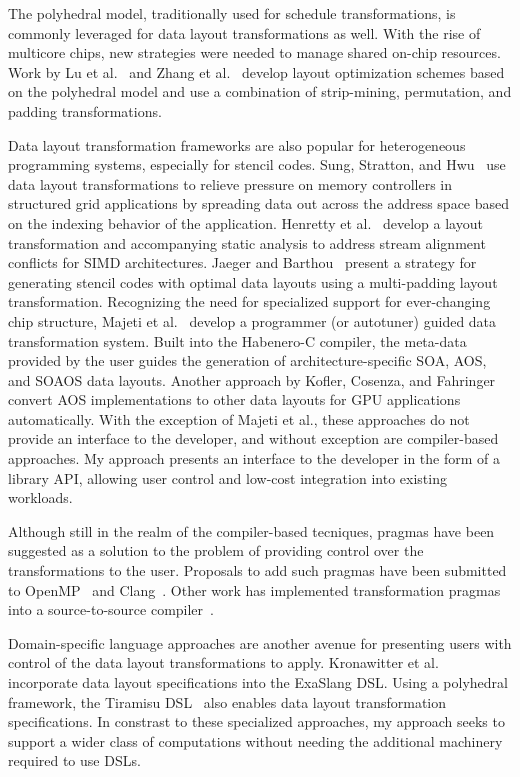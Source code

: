 \documentclass{article}
\begin{document}
The polyhedral model, traditionally used for schedule transformations, is commonly leveraged for data layout transformations as well.
With the rise of multicore chips, new strategies were needed to manage shared on-chip resources. 
Work by Lu et al.~\cite{lu2009data} and Zhang et al.~\cite{zhang2011optimizing} develop layout optimization schemes based on the polyhedral model and use a combination of strip-mining, permutation, and padding transformations.


Data layout transformation frameworks are also popular for heterogeneous programming systems, especially for stencil codes.
Sung, Stratton, and Hwu~\cite{sung2010data} use data layout transformations to relieve pressure on memory controllers in structured grid applications by spreading data out across the address space based on the indexing behavior of the application.
Henretty et al.~\cite{henretty2011data} develop a layout transformation and accompanying static analysis to address stream alignment conflicts for SIMD architectures.
Jaeger and Barthou~\cite{jaeger2012automatic} present a strategy for generating stencil codes with optimal data layouts using a multi-padding layout transformation.
Recognizing the need for specialized support for ever-changing chip structure, Majeti et al.~\cite{majeti2013compiler} develop a programmer (or autotuner) guided data transformation system.
Built into the Habenero-C compiler, the meta-data provided by the user guides the generation of architecture-specific SOA, AOS, and SOAOS data layouts.
Another approach by Kofler, Cosenza, and Fahringer~\cite{kofler2015automatic} convert AOS implementations to other data layouts for GPU applications automatically.  
With the exception of Majeti et al., these approaches do not provide an interface to the developer, and without exception are compiler-based approaches.
My approach presents an interface to the developer in the form of a library API, allowing user control and low-cost integration into existing workloads.

Although still in the realm of the compiler-based tecniques, pragmas have been suggested as a solution to the problem of providing control over the transformations to the user.
Proposals to add such pragmas have been submitted to OpenMP~\cite{kruse2019design} and Clang~\cite{kruse2018user}.
Other work has implemented transformation pragmas into a source-to-source compiler~\cite{xu2014semi}. 


Domain-specific language approaches are another avenue for presenting users with control of the data layout transformations to apply. 
Kronawitter et al.~\cite{kronawitter2018automatic} incorporate data layout specifications into the ExaSlang DSL.
Using a polyhedral framework, the Tiramisu DSL~\cite{baghdadi2019tiramisu} also enables data layout transformation specifications.
In constrast to these specialized approaches, my approach seeks to support a wider class of computations without needing the additional machinery required to use DSLs. 
\end{document}
